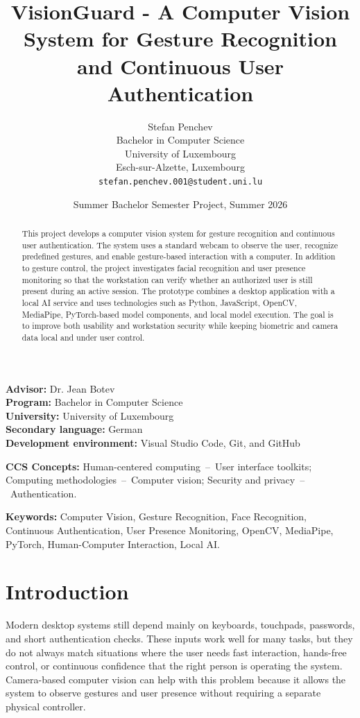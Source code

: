 \documentclass[10pt,twocolumn]{article}
\title{VisionGuard - A Computer Vision System for Gesture Recognition and Continuous User Authentication}
\author{
Stefan Penchev\\
Bachelor in Computer Science\\
University of Luxembourg\\
Esch-sur-Alzette, Luxembourg\\
\texttt{stefan.penchev.001@student.uni.lu}
}
\date{Summer Bachelor Semester Project, Summer 2026}
\begin{document}
\maketitle

\noindent\textbf{Advisor:} Dr. Jean Botev\\
\textbf{Program:} Bachelor in Computer Science\\
\textbf{University:} University of Luxembourg\\
\textbf{Secondary language:} German\\
\textbf{Development environment:} Visual Studio Code, Git, and GitHub

\medskip

\begin{abstract}
This project develops a computer vision system for gesture recognition and continuous user authentication.
The system uses a standard webcam to observe the user, recognize predefined gestures, and enable gesture-based interaction with a computer.
In addition to gesture control, the project investigates facial recognition and user presence monitoring so that the workstation can verify whether an authorized user is still present during an active session.
The prototype combines a desktop application with a local AI service and uses technologies such as Python, JavaScript, OpenCV, MediaPipe, PyTorch-based model components, and local model execution.
The goal is to improve both usability and workstation security while keeping biometric and camera data local and under user control.
\end{abstract}

\noindent\textbf{CCS Concepts:}
Human-centered computing~--~User interface toolkits;
Computing methodologies~--~Computer vision;
Security and privacy~--~Authentication.

\medskip
\noindent\textbf{Keywords:}
Computer Vision, Gesture Recognition, Face Recognition, Continuous Authentication, User Presence Monitoring, OpenCV, MediaPipe, PyTorch, Human-Computer Interaction, Local AI.

\section{Introduction}
Modern desktop systems still depend mainly on keyboards, touchpads, passwords, and short authentication checks.
These inputs work well for many tasks, but they do not always match situations where the user needs fast interaction, hands-free control, or continuous confidence that the right person is operating the system.
Camera-based computer vision can help with this problem because it allows the system to observe gestures and user presence without requiring a separate physical controller.
\end{document}
